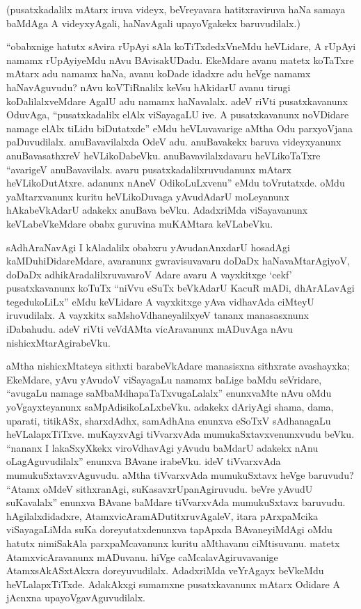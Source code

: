 (pusatxkadalilx mAtarx iruva videyx, beVreyavara hatitxraviruva haNa samaya baMdAga A videyxyAgali, haNavAgali upayoVgakekx baruvudilalx.)

``obabxnige hatutx sAvira rUpAyi sAla koTiTxdedxVneMdu heVLidare, A rUpAyi namamx rUpAyiyeMdu nAvu BAvisakUDadu. EkeMdare avanu matetx koTaTxre mAtarx adu namamx haNa, avanu koDade idadxre adu heVge namamx haNavAguvudu? nAvu koVTiRnalilx keVsu hAkidarU avanu tirugi koDalilalxveMdare AgalU adu namamx haNavalalx. adeV riVti pusatxkavanunx OduvAga, ``pusatxkadalilx elAlx viSayagaLU ive. A pusatxkavanunx noVDidare namage elAlx tiLidu biDutatxde'' eMdu heVLuvavarige aMtha Odu parxyoVjana paDuvudilalx. anuBavavilalxda OdeV adu. anuBavakekx baruva videyxyanunx anuBavasathxreV heVLikoDabeVku. anuBavavilalxdavaru heVLikoTaTxre ``avarigeV anuBavavilalx. avaru pusatxkadalilxruvudanunx mAtarx heVLikoDutAtxre. adanunx nAneV OdikoLuLxvenu'' eMdu toVrutatxde. oMdu yaMtarxvanunx kuritu heVLikoDuvaga yAvudAdarU moLeyanunx hAkabeVkAdarU adakekx anuBava beVku. AdadxriMda viSayavanunx keVLabeVkeMdare obabx guruvina muKAMtara keVLabeVku.

sAdhAraNavAgi I kAladalilx obabxru yAvudanAnxdarU hosadAgi kaMDuhiDidareMdare, avaranunx gwravisuvavaru doDaDx haNavaMtarAgiyoV, doDaDx adhikAradalilxruvavaroV Adare avaru A vayxkitxge `cekf' pusatxkavanunx koTuTx ``niVvu eSuTx beVkAdarU KacuR mADi, dhArALavAgi tegedukoLiLx'' eMdu keVLidare A vayxkitxge yAva vidhavAda ciMteyU iruvudilalx. A vayxkitx saMshoVdhaneyalilxyeV tananx manasasxnunx iDabahudu. adeV riVti veVdAMta vicAravanunx mADuvAga nAvu nishicxMtarAgirabeVku.

aMtha nishicxMtateya sithxti barabeVkAdare manasisxna sithxrate avashayxka; EkeMdare, yAvu yAvudoV viSayagaLu namamx baLige baMdu seVridare, ``avugaLu namage saMbaMdhapaTaTxvugaLalalx'' enunxvaMte nAvu oMdu yoVgayxteyanunx saMpAdisikoLaLxbeVku. adakekx dAriyAgi shama, dama, uparati, titikASx, sharxdAdhx, samAdhAna enunxva eSoTxV sAdhanagaLu heVLalapxTiTxve. muKayxvAgi tiVvarxvAda mumukaSxtavxvenunxvudu beVku. ``nananx I lakaSxyXkekx viroVdhavAgi yAvudu baMdarU adakekx nAnu oLagAguvudilalx'' enunxva BAvane irabeVku. ideV tiVvarxvAda mumukuSxtavxvAguvudu. aMtha tiVvarxvAda mumukuSxtavx heVge baruvudu? ``Atamx oMdeV sithxranAgi, suKasavxrUpanAgiruvudu. beVre yAvudU suKavalalx'' enunxva BAvane baMdare tiVvarxvAda mumukuSxtavx baruvudu. hAgilalxdidadxre, AtamxvicAramADutitxruvAgaleV, itara pArxpaMcika viSayagaLiMda suKa doreyutatxdenunxva tapApxda BAvaneyiMdAgi oMdu hatutx nimiSakAla parxpaMcavanunx kuritu aMthavanu ciMtisuvanu. matetx AtamxvicAravanunx mADuvanu. hiVge caMcalavAgiruvavanige AtamxsAkASxtAkxra doreyuvudilalx. AdadxriMda veYrAgayx beVkeMdu heVLalapxTiTxde. AdakAkxgi sumamxne pusatxkavanunx mAtarx Odidare A jAcnxna upayoVgavAguvudilalx.

